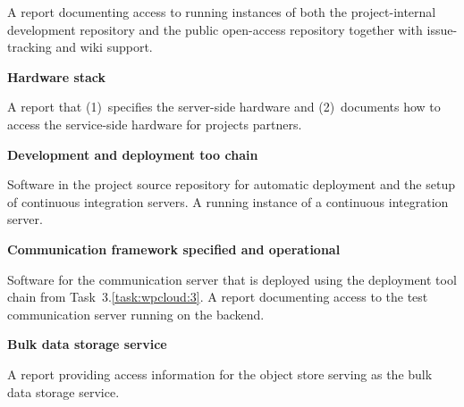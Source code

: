 {\begin{deliverables}{\WPCloudNo}
A report documenting access to running instances of
    both the project-internal development repository
    and the public open-access repository
    together with issue-tracking and wiki support.


\item {\bf Hardware stack} 
	\delresponsible{\IBM}
	\label{del:wpcloud:2}

 A report that
  (1)~specifies the server-side hardware and
  (2)~documents how to access the service-side hardware for projects partners.


\item {\bf Development and deployment too chain} 
	\delresponsible{\IBM}
	\label{del:wpcloud:3}

Software in the project source repository for
  automatic deployment and the setup of continuous integration servers.
  A running instance of a continuous integration server.



\item {\bf Communication framework specified and operational} 
	\delresponsible{\IBM}
	\label{del:wpcloud:4}

Software for the communication server
  that is deployed using the deployment tool chain from
  Task~3.\ref{task:wpcloud:3}.
  A report documenting access to the test communication server running
  on the backend.


\item {\bf Bulk data storage service} 
  \label{del:wpcloud:5}

A report providing access information for the object store
  serving as the bulk data storage service.
\end{deliverables}




\mosriskheader

}
